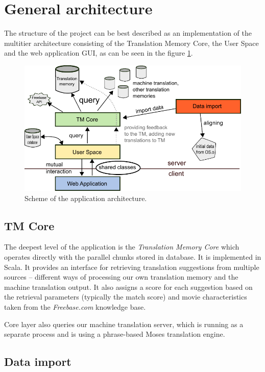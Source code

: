 \section{General architecture}
The structure of the project can be best described as an implementation of the multitier architecture consisting of the Translation Memory Core, the User Space and the web application GUI, as can be seen in the figure \ref{projectStructure:layers}.

\begin{figure}[h]
\begin{center}
\includegraphics{figures/scheme.pdf}
\end{center}
\caption{Scheme of the application architecture.}\label{projectStructure:layers}
\end{figure}

\subsection*{TM Core}
The deepest level of the application is the \emph{Translation Memory Core} which operates directly with the parallel chunks stored in database. It is implemented in Scala. It provides an interface for retrieving translation suggestions from multiple sources -- different ways of processing our own translation memory and the machine translation output. It also assigns a score for each suggestion based on the retrieval parameters (typically the match score) and movie characteristics taken from the \emph{Freebase.com} knowledge base.

Core layer also queries our machine translation server, which is running as a separate process and is using a phrase-based Moses translation engine.

\subsection*{Data import}

